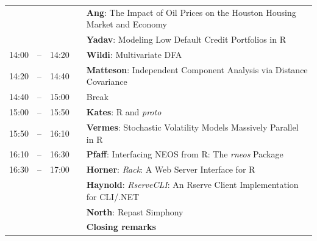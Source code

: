 \documentclass[letterpaper,10pt]{article}
\newcommand{\mylinecolor}[1]{\color{#1}\vspace{-8pt}}  %
\begin{document}
\begin{tabular}{rlrlp{5in}}
     & &      &   &\textbf{\color{LightningTalk} Ang}: \small{The Impact of Oil Prices on the Houston Housing Market and Economy} \\
     & &      &   &\textbf{\color{LightningTalk} Yadav}: \small{Modeling Low Default Credit Portfolios in R} \\
14:00&\color{Breaks}-- & 14:20&   &\textbf{\color{Talk} Wildi}: \small{Multivariate DFA} \\
14:20&\color{Breaks}-- & 14:40&   &\textbf{\color{Talk} Matteson}: \small{Independent Component Analysis via Distance Covariance} \\
14:40&\color{Breaks}-- & 15:00&   &\small{\mylinecolor{Breaks} Break} \\
15:00&\color{Breaks}-- & 15:50&   &\textbf{\color{KeynoteTalk} Kates}: \small{R and \emph{proto}} \\
15:50&\color{Breaks}-- & 16:10&   &\textbf{\color{Talk} Vermes}: \small{Stochastic Volatility Models Massively Parallel in R} \\
16:10&\color{Breaks}-- & 16:30&   &\textbf{\color{Talk} Pfaff}: \small{Interfacing NEOS from R: The \emph{rneos} Package} \\
16:30&\color{Breaks}-- & 17:00&   &\textbf{\color{LightningTalk} Horner}: \small{\emph{Rack}: A Web Server Interface for R} \\
     & &      &   &\textbf{\color{LightningTalk} Haynold}: \small{\emph{RserveCLI}: An Rserve Client Implementation for CLI/.NET} \\
     & &      &   &\textbf{\color{LightningTalk} North}: \small{Repast Simphony} \\
     & &      &   &\textbf{\color{Breaks} Closing remarks} \\

\end{tabular}
\end{document}
